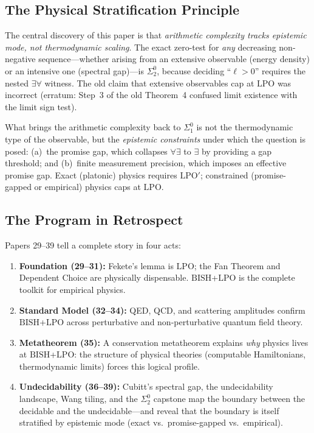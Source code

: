 \documentclass[11pt,a4paper]{article}
\theoremstyle{plain}
\theoremstyle{definition}
\newcommand{\LPO}{\ensuremath{\mathrm{LPO}}}
\newcommand{\LPOj}{\ensuremath{\mathrm{LPO'}}}
\newcommand{\BISH}{\ensuremath{\mathrm{BISH}}}
\begin{document}
\subsection{The Physical Stratification Principle}

The central discovery of this paper is that \emph{arithmetic complexity
tracks epistemic mode, not thermodynamic scaling}.  The exact zero-test
for \emph{any} decreasing non-negative sequence---whether arising from
an extensive observable (energy density) or an intensive one (spectral
gap)---is $\Sigma_2^0$, because deciding ``$\ell > 0$'' requires the
nested $\exists\forall$ witness.  The old claim that extensive
observables cap at $\LPO$ was incorrect (erratum: Step~3 of the old
Theorem~4 confused limit existence with the limit sign test).

What brings the arithmetic complexity back to $\Sigma_1^0$ is not the
thermodynamic type of the observable, but the \emph{epistemic constraints}
under which the question is posed: (a)~the promise gap, which collapses
$\forall\exists$ to $\exists$ by providing a gap threshold; and
(b)~finite measurement precision, which imposes an effective promise gap.
Exact (platonic) physics requires $\LPOj$; constrained
(promise-gapped or empirical) physics caps at $\LPO$.

\subsection{The Program in Retrospect}

Papers 29--39 tell a complete story in four acts:
\begin{enumerate}[nosep]
\item \textbf{Foundation (29--31):} Fekete's lemma is $\LPO$; the
  Fan Theorem and Dependent Choice are physically dispensable.
  $\BISH$+$\LPO$ is the complete toolkit for empirical physics.
\item \textbf{Standard Model (32--34):} QED, QCD, and scattering
  amplitudes confirm $\BISH$+$\LPO$ across perturbative and
  non-perturbative quantum field theory.
\item \textbf{Metatheorem (35):} A conservation metatheorem explains
  \emph{why} physics lives at $\BISH$+$\LPO$: the structure of
  physical theories (computable Hamiltonians, thermodynamic limits)
  forces this logical profile.
\item \textbf{Undecidability (36--39):} Cubitt's spectral gap, the
  undecidability landscape, Wang tiling, and the $\Sigma_2^0$
  capstone map the boundary between the decidable and the
  undecidable---and reveal that the boundary is itself stratified
  by epistemic mode (exact vs.\ promise-gapped vs.\ empirical).
\end{enumerate}
\end{document}
